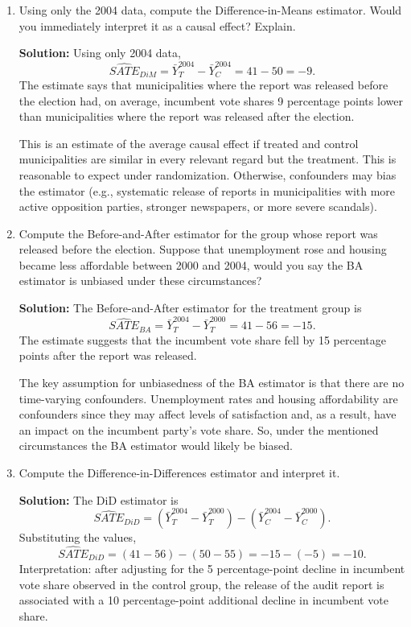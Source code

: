 \documentclass[11pt]{exam}
\begin{document}
\begin{questions}
\begin{enumerate}[leftmargin = 0.5cm, label = (\alph*), rightmargin = 0.2cm]
    \item Using only the 2004 data, compute the Difference-in-Means estimator. Would you immediately interpret it as a causal effect? Explain.

    \begin{solutionorbox}[6.5cm]
    \textbf{Solution:} Using only 2004 data,
    \[
    \widehat{SATE}_{DiM}=\bar Y_T^{2004}-\bar Y_C^{2004}=41-50=-9.
    \]
    The estimate says that municipalities where the report was released before the election had, on average, incumbent vote shares 9 percentage points lower than municipalities where the report was released after the election.

    This is an estimate of the average causal effect if treated and control municipalities are similar in every relevant regard but the treatment. This is reasonable to expect under randomization. Otherwise, confounders may bias the estimator (e.g., systematic release of reports in municipalities with more active opposition parties, stronger newspapers, or more severe scandals).
    \end{solutionorbox}

    \item Compute the Before-and-After estimator for the group whose report was released before the election. Suppose that unemployment rose and housing became less affordable between 2000 and 2004, would you say the BA estimator is unbiased under these circumstances?

    \begin{solutionorbox}[7cm]
    \textbf{Solution:} The Before-and-After estimator for the treatment group is
    \[
    \widehat{SATE}_{BA}=\bar Y_T^{2004}-\bar Y_T^{2000}=41-56=-15.
    \]
    The estimate suggests that the incumbent vote share fell by 15 percentage points after the report was released.

    The key assumption for unbiasedness of the BA estimator is that there are no time-varying confounders. Unemployment rates and housing affordability are confounders since they may affect levels of satisfaction and, as a result, have an impact on the incumbent party's vote share. So, under the mentioned circumstances the BA estimator would likely be biased.
    \end{solutionorbox}

    \item Compute the Difference-in-Differences estimator and interpret it.

    \begin{solutionorbox}[7.5cm]
    \textbf{Solution:} The DiD estimator is
    \[
    \widehat{SATE}_{DiD}
    =\left(\bar Y_T^{2004}-\bar Y_T^{2000}\right)-\left(\bar Y_C^{2004}-\bar Y_C^{2000}\right).
    \]
    Substituting the values,
    \[
    \widehat{SATE}_{DiD}=(41-56)-(50-55)=-15-(-5)=-10.
    \]
    Interpretation: after adjusting for the 5 percentage-point decline in incumbent vote share observed in the control group, the release of the audit report is associated with a 10 percentage-point additional decline in incumbent vote share.
    \end{solutionorbox}


\end{enumerate}
\end{questions}
\end{document}
